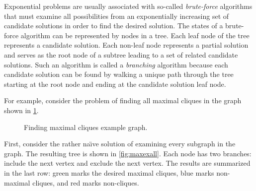 Exponential problems are usually associated with so-called \emph{brute-force} algorithms that must examine all
possibilities from an exponentially increasing set of candidate solutions in order to find the desired solution.
The states of a brute-force algorithm can be represented by nodes in a tree.  Each leaf node of the tree represents
a candidate solution.  Each non-leaf node represents a partial solution and serves as the root node of a subtree
leading to a set of related candidate solutions.  Such an algorithm is called a \emph{branching} algorithm because
each candidate solution can be found by walking a unique path through the tree starting at the root node and ending
at the candidate solution leaf node.

For example, consider the problem of finding all maximal cliques in the graph shown in
\figurename\ref{fig:maxexample}.

\begin{figure}[H]
  \centering
  \caption{Finding maximal cliques example graph.}
  \label{fig:maxexample}
\end{figure}

First, consider the rather na\"{\i}ve solution of examining every subgraph in the graph.  The resulting tree is
shown in \figurename\ref{fig:maxexall}.  Each node has two branches: include the next vertex and exclude the next
vertex.  The results are summarized in the last row: green marks the desired maximal cliques, blue marks
non-maximal cliques, and red marks non-cliques.

